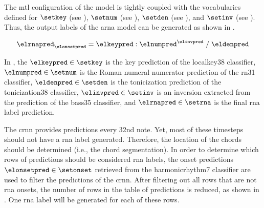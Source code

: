 
The \gls{mtl} configuration of the model is tightly coupled
with the vocabularies defined for $\setkey$ (see
), $\setnum$ (see
), $\setden$
(see ), and
$\setinv$ (see
). Thus, the
output labels of the \gls{arna} model can be generated as
shown in . 

\begin{equation}
    \label{eq:rna_pred}
    \elrnapred_{\elonsetpred} = \elkeypred : \elnumpred^{\elinvpred} \; / \; \eldenpred
\end{equation}

In , the $\elkeypred \in \setkey$ is the key
prediction of the \gls{localkey38} classifier, $\elnumpred
\in \setnum$ is the Roman numeral numerator prediction of
the \gls{rn31} classifier, $\eldenpred \in \setden$ is the
tonicization prediction of the \gls{tonicization38}
classifier, $\elinvpred \in \setinv$ is an inversion
extracted from the prediction of the \gls{bass35}
classifier, and $\elrnapred \in \setrna$ is the final
\gls{rna} label prediction.


The \gls{crnn} provides predictions every \gls{32nd} note.
Yet, most of these timesteps should not have a \gls{rna}
label generated. Therefore, the location of the chords
should be determined (i.e., the chord segmentation). In
order to determine which rows of predictions should be
considered \gls{rna} labels, the onset predictions
$\elonsetpred \in \setonset$ retrieved from the
\gls{harmonicrhythm7} classifier are used to filter the
predictions of the \gls{crnn}. After filtering out all rows
that are not \gls{rna} onsets, the number of rows in the
table of predictions is reduced, as shown in
. One \gls{rna} label will
be generated for each of these rows.


